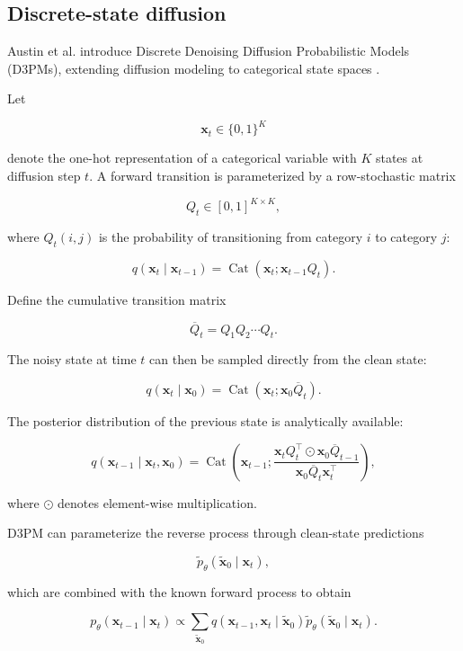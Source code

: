 \subsection{Discrete-state diffusion}
\label{subsec:rw_discrete_graph_diffusion}

Austin et al. introduce Discrete Denoising Diffusion Probabilistic Models (D3PMs), extending diffusion modeling to categorical state spaces \cite{austin2021structured}.

Let

\[
\mathbf{x}_t\in\{0,1\}^{K}
\]

denote the one-hot representation of a categorical variable with \(K\) states at diffusion step \(t\). A forward transition is parameterized by a row-stochastic matrix

\[
Q_t\in[0,1]^{K\times K},
\]

where \(Q_t(i,j)\) is the probability of transitioning from category \(i\) to category \(j\):

\[
q(\mathbf{x}_t\mid\mathbf{x}_{t-1})
=
\operatorname{Cat}
\left(
\mathbf{x}_t;
\mathbf{x}_{t-1}Q_t
\right).
\]

Define the cumulative transition matrix

\[
\overline{Q}_t
=
Q_1Q_2\cdots Q_t.
\]

The noisy state at time \(t\) can then be sampled directly from the clean state:

\[
q(\mathbf{x}_t\mid\mathbf{x}_0)
=
\operatorname{Cat}
\left(
\mathbf{x}_t;
\mathbf{x}_0\overline{Q}_t
\right).
\]

The posterior distribution of the previous state is analytically available:

\[
q
\left(
\mathbf{x}_{t-1}
\mid
\mathbf{x}_t,\mathbf{x}_0
\right)
=
\operatorname{Cat}
\left(
\mathbf{x}_{t-1};
\frac{
\mathbf{x}_t Q_t^\top
\odot
\mathbf{x}_0\overline{Q}_{t-1}
}{
\mathbf{x}_0\overline{Q}_t\mathbf{x}_t^\top
}
\right),
\]

where \(\odot\) denotes element-wise multiplication.

D3PM can parameterize the reverse process through clean-state predictions

\[
\widetilde{p}_\theta
\left(
\widetilde{\mathbf{x}}_0
\mid
\mathbf{x}_t
\right),
\]

which are combined with the known forward process to obtain

\[
p_\theta
\left(
\mathbf{x}_{t-1}
\mid
\mathbf{x}_t
\right)
\propto
\sum_{\widetilde{\mathbf{x}}_0}
q
\left(
\mathbf{x}_{t-1},
\mathbf{x}_t
\mid
\widetilde{\mathbf{x}}_0
\right)
\widetilde{p}_\theta
\left(
\widetilde{\mathbf{x}}_0
\mid
\mathbf{x}_t
\right).
\]

